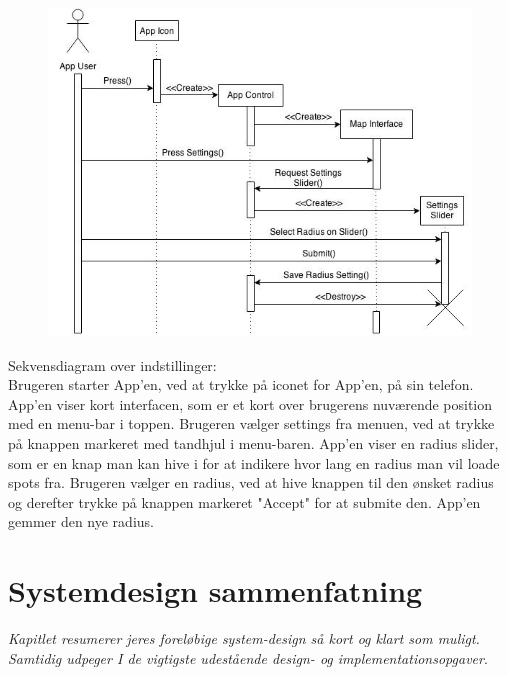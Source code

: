 \documentclass[12pt]{article}
\begin{document}
\begin{figure}[h]
\includegraphics[scale = 0.5]{sekdia3}
\end{figure}

Sekvensdiagram over indstillinger:\\
Brugeren starter App'en, ved at trykke på iconet for App'en, på sin telefon. App'en viser kort interfacen, 
som er et kort over brugerens nuværende position med en menu-bar i toppen. Brugeren vælger settings fra menuen, 
ved at trykke på knappen markeret med tandhjul i menu-baren. App'en viser en radius slider, som er en knap man kan hive i
for at indikere hvor lang en radius man vil loade spots fra. Brugeren vælger en radius, ved at hive knappen til den ønsket
radius og derefter trykke på knappen markeret "Accept" for at submite den. App'en gemmer den nye radius.

\pagebreak

\section{Systemdesign sammenfatning}
\textit{Kapitlet resumerer jeres foreløbige system-design så kort og klart som muligt. Samtidig
udpeger I de vigtigste udestående design- og implementationsopgaver}.\\
\end{document}
